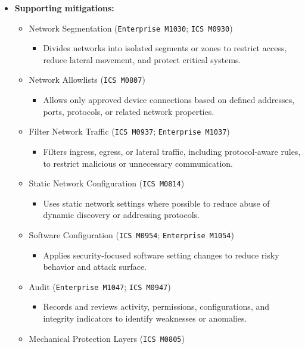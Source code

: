 \documentclass[10pt,a4paper,oneside]{report}
\begin{document}
\begin{itemize}
\item \textbf{Supporting mitigations:}
\begin{itemize}
\item Network Segmentation (\texttt{Enterprise M1030}; \texttt{ICS M0930})
\begin{itemize}
\item Divides networks into isolated segments or zones to restrict access, reduce lateral movement, and protect critical systems.
\end{itemize}
\item Network Allowlists (\texttt{ICS M0807})
\begin{itemize}
\item Allows only approved device connections based on defined addresses, ports, protocols, or related network properties.
\end{itemize}
\item Filter Network Traffic (\texttt{ICS M0937}; \texttt{Enterprise M1037})
\begin{itemize}
\item Filters ingress, egress, or lateral traffic, including protocol-aware rules, to restrict malicious or unnecessary communication.
\end{itemize}
\item Static Network Configuration (\texttt{ICS M0814})
\begin{itemize}
\item Uses static network settings where possible to reduce abuse of dynamic discovery or addressing protocols.
\end{itemize}
\item Software Configuration (\texttt{ICS M0954}; \texttt{Enterprise M1054})
\begin{itemize}
\item Applies security-focused software setting changes to reduce risky behavior and attack surface.
\end{itemize}
\item Audit (\texttt{Enterprise M1047}; \texttt{ICS M0947})
\begin{itemize}
\item Records and reviews activity, permissions, configurations, and integrity indicators to identify weaknesses or anomalies.
\end{itemize}
\item Mechanical Protection Layers (\texttt{ICS M0805})
\begin{itemize}

\end{itemize}
\end{itemize}
\end{itemize}
\end{document}
